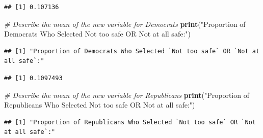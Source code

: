 \documentclass[
  11pt,
]{article}
\newenvironment{Shaded}{\begin{snugshade}}{\end{snugshade}}
\newcommand{\CommentTok}[1]{\textcolor[rgb]{0.56,0.35,0.01}{\textit{#1}}}
\newcommand{\FunctionTok}[1]{\textcolor[rgb]{0.13,0.29,0.53}{\textbf{#1}}}
\newcommand{\NormalTok}[1]{#1}
\newcommand{\SpecialCharTok}[1]{\textcolor[rgb]{0.81,0.36,0.00}{\textbf{#1}}}
\newcommand{\StringTok}[1]{\textcolor[rgb]{0.31,0.60,0.02}{#1}}
\begin{document}
\begin{verbatim}
## [1] 0.107136
\end{verbatim}

\begin{Shaded}
\begin{Highlighting}[]
\CommentTok{\# Describe the mean of the new variable for Democrats}
\FunctionTok{print}\NormalTok{(}\StringTok{"Proportion of Democrats Who Selected \textasciigrave{}Not too safe\textasciigrave{} OR \textasciigrave{}Not at all safe\textasciigrave{}:"}\NormalTok{)}
\end{Highlighting}
\end{Shaded}

\begin{verbatim}
## [1] "Proportion of Democrats Who Selected `Not too safe` OR `Not at all safe`:"
\end{verbatim}

\begin{Shaded}
\end{Shaded}

\begin{verbatim}
## [1] 0.1097493
\end{verbatim}

\begin{Shaded}
\begin{Highlighting}[]
\CommentTok{\# Describe the mean of the new variable for Republicans}
\FunctionTok{print}\NormalTok{(}\StringTok{"Proportion of Republicans Who Selected \textasciigrave{}Not too safe\textasciigrave{} OR \textasciigrave{}Not at all safe\textasciigrave{}:"}\NormalTok{)}
\end{Highlighting}
\end{Shaded}

\begin{verbatim}
## [1] "Proportion of Republicans Who Selected `Not too safe` OR `Not at all safe`:"
\end{verbatim}

\begin{Shaded}
\end{Shaded}
\end{document}
